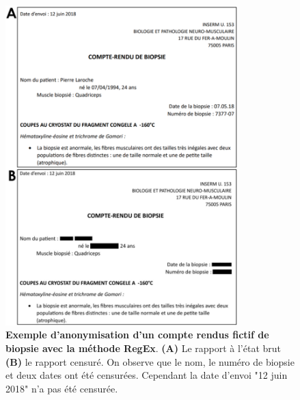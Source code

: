 \begin{figure}[!htbp]
 \centering
 \includegraphics[width=0.8\textwidth]{figures/regex.png}
 \caption[Exemple anonymisation RegEx]{\textbf{Exemple d'anonymisation d'un compte rendus fictif de biopsie avec la méthode RegEx}. \textbf{(A)} Le rapport à l'état brut \textbf{(B)} le rapport censuré. On observe que le nom, le numéro de biopsie et deux dates ont été censurées. Cependant la date d'envoi "12 juin 2018" n'a pas été censurée.}
 \label{fig:regex}
\end{figure}

